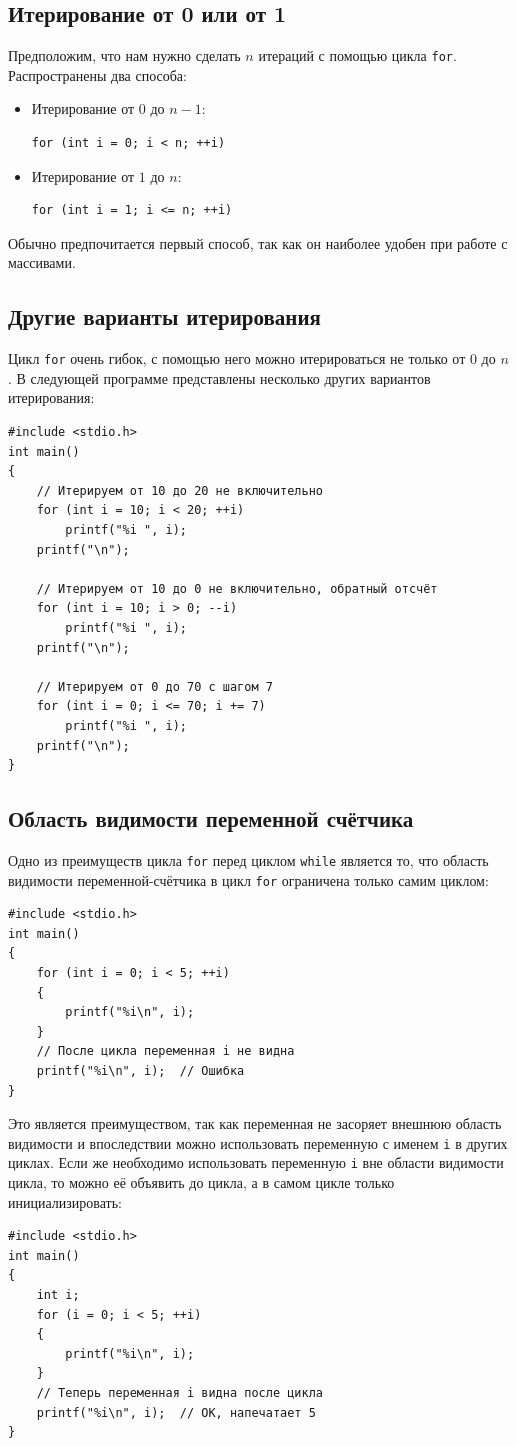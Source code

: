 \documentclass[10pt]{article}
\begin{document}
\subsection*{Итерирование от 0 или от 1}
Предположим, что нам нужно сделать $n$ итераций с помощью цикла \texttt{for}. Распространены два способа:
\begin{itemize}
\item Итерирование от $0$ до $n - 1$:
\begin{lstlisting}
for (int i = 0; i < n; ++i)
\end{lstlisting}

\item Итерирование от $1$ до $n$:
\begin{lstlisting}
for (int i = 1; i <= n; ++i)
\end{lstlisting}
\end{itemize}
Обычно предпочитается первый способ, так как он наиболее удобен при работе с массивами.

\subsection*{Другие варианты итерирования}
Цикл \texttt{for} очень гибок, с помощью него можно итерироваться не только от $0$ до $n$. В следующей программе представлены несколько других вариантов итерирования:
\begin{lstlisting}
#include <stdio.h>
int main()
{
	// Итерируем от 10 до 20 не включительно
	for (int i = 10; i < 20; ++i)
		printf("%i ", i);
	printf("\n");
	
	// Итерируем от 10 до 0 не включительно, обратный отсчёт
	for (int i = 10; i > 0; --i)
		printf("%i ", i);
	printf("\n");	
	
	// Итерируем от 0 до 70 с шагом 7
	for (int i = 0; i <= 70; i += 7)
		printf("%i ", i);
	printf("\n");	
}
\end{lstlisting}


\subsection*{Область видимости переменной счётчика}
Одно из преимуществ цикла \texttt{for} перед циклом \texttt{while} является то, что область видимости переменной-счётчика в цикл \texttt{for} ограничена только самим циклом:
\begin{lstlisting}
#include <stdio.h>
int main()
{
	for (int i = 0; i < 5; ++i)
	{
		printf("%i\n", i);
	}
	// После цикла переменная i не видна
	printf("%i\n", i);  // Ошибка
}
\end{lstlisting}
Это является преимуществом, так как переменная не засоряет внешнюю область видимости и впоследствии можно использовать переменную с именем \texttt{i} в других циклах. Если же необходимо использовать переменную \texttt{i} вне области видимости цикла, то можно её объявить до цикла, а в самом цикле только инициализировать:
\begin{lstlisting}
#include <stdio.h>
int main()
{
	int i;
	for (i = 0; i < 5; ++i)
	{
		printf("%i\n", i);
	}
	// Теперь переменная i видна после цикла
	printf("%i\n", i);  // ОК, напечатает 5
}	
\end{lstlisting}
\end{document}
